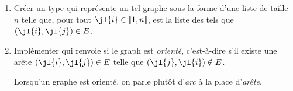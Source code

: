\documentclass{article}
\newcommand{\llbra}{\left\llbracket}
\newcommand{\rrbra}{\right\rrbracket}
\renewcommand{\brack}[1]{\ensuremath{\llbra#1\rrbra}}
\begin{document}
\begin{enumerate}
	\item Créer un type  qui représente un tel graphe sous la forme d'une liste  de taille $n$ telle que, pour tout $\jl{i}\in\brack{1,n}$,  est la liste des  tels que $(\jl{i},\jl{j})\in E$.



	\item Implémenter  qui renvoie  si le graph est \emph{orienté}, c'est-à-dire s'il existe une arête $(\jl{i},\jl{j})\in E$ telle que $(\jl{j},\jl{i})\notin E$.

	Lorsqu'un graphe est orienté, on parle plutôt d'\emph{arc} à la place d'\emph{arête}.
\end{enumerate}
\end{document}
